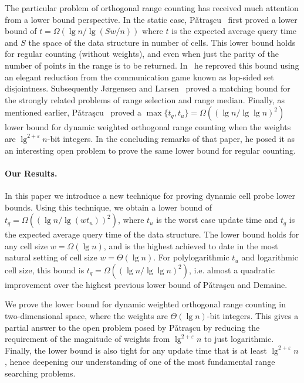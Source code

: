 \documentclass[letterpaper]{article}
\newcommand{\eps}{\varepsilon}
\begin{document}
The particular problem of orthogonal range counting has received much
attention from a lower bound perspective. In the static case, P{\v
  a}tra{\c s}cu~\cite{patrascu07sum2D} first proved a lower bound of
$t=\Omega(\lg n/\lg(Sw/n))$ where $t$ is the expected average query
time and $S$ the space of the data structure in number of cells. This
lower bound holds for regular counting (without weights), and even
when just the parity of the number of points in the range is to be
returned. In~\cite{patrascu08structures} he reproved this bound using
an elegant reduction from the communication game known as lop-sided
set disjointness. Subsequently J\o rgensen and
Larsen~\cite{larsen:median} proved a matching bound for the strongly
related problems of range selection and range median. Finally, as
mentioned earlier, P{\v a}tra{\c s}cu~\cite{patrascu07sum2D} proved a
$\max\{t_q,t_u\}=\Omega((\lg n/\lg \lg n)^2)$ lower bound for dynamic
weighted orthogonal range counting when the weights are
$\lg^{2+\eps}n$-bit integers. In the concluding remarks of that
paper, he posed it as an interesting open problem to prove the same
lower bound for regular counting.

\paragraph{Our Results.}
In this paper we introduce a new technique for proving dynamic cell
probe lower bounds. Using this technique, we obtain a lower bound of
$t_q=\Omega((\lg n/\lg(wt_u))^2)$, where $t_u$ is the worst case
update time and $t_q$ is the expected average query time of the data
structure. The lower bound holds for any cell size $w=\Omega(\lg n)$,
and is the highest achieved to date in the most natural setting of
cell size $w=\Theta(\lg n)$.  For polylogarithmic $t_u$ and
logarithmic cell size, this bound is $t_q = \Omega((\lg n/\lg \lg
n)^2)$, i.e. almost a quadratic improvement over the highest previous
lower bound of P{\v a}tra{\c s}cu and Demaine.

We prove the lower bound for dynamic weighted orthogonal range
counting in two-dimensional space, where the weights are $\Theta(\lg
n)$-bit integers. This gives a partial answer to the open problem
posed by P{\v a}tra{\c s}cu by reducing the requirement of the
magnitude of weights from $\lg^{2+\eps}n$ to just
logarithmic. Finally, the lower bound is also tight for any update
time that is at least $\lg^{2+\eps}n$, hence deepening our
understanding of one of the most fundamental range searching problems.
\end{document}
